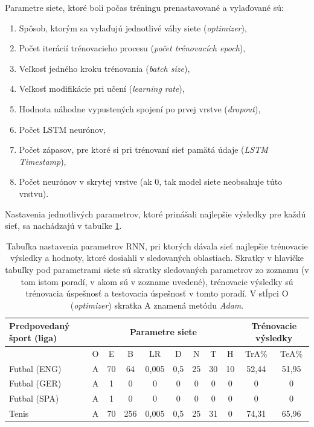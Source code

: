 Parametre siete, ktoré boli počas tréningu prenastavované a vylaďované sú:
\begin{enumerate}
  \item Spôsob, ktorým sa vylaďujú jednotlivé váhy siete (\textit{optimizer}),
  \item Počet iterácií trénovacieho procesu (\textit{počet trénovacích epoch}),
  \item Veľkosť jedného kroku trénovania (\textit{batch size}),
  \item Veľkosť modifikácie pri učení (\textit{learning rate}),
  \item Hodnota náhodne vypustených spojení po prvej vrstve (\textit{dropout}),
  \item Počet LSTM neurónov,
  \item Počet zápasov, pre ktoré si pri trénovaní sieť pamätá údaje (\textit{LSTM Timestamp}),
  \item Počet neurónov v skrytej vrstve (ak 0, tak model siete neobsahuje túto vrstvu).
\end{enumerate}

Nastavenia jednotlivých parametrov, ktoré prinášali najlepšie výsledky pre každú sieť, sa nachádzajú v tabuľke \ref{rnn_train_res}.

\begin{table}[h!]
\begin{center}
\begin{tabular}{ p{7em}|c|c|c|c|c|c|c|c|c|c| } 
 Predpovedaný šport (liga) & \multicolumn{8}{|c|}{Parametre siete} & \multicolumn{2}{|p{5em}|}{Trénovacie výsledky}  \\ 
 \hline
  & O & E & B & LR & D & N & T & H & TrA\% & TeA\% \\
 \hline \hline
 Futbal (ENG) & A & 70 & 64 & 0,005 & 0,5 & 25 & 30 & 10 & 52,44 & 51,95  \\ 
 Futbal (GER) & A & 1 & 0 & 0 & 0 & 0 & 0 & 0 & 0 & 0  \\ 
 Futbal (SPA) & A & 1 & 0 & 0 & 0 & 0 & 0 & 0 & 0 & 0  \\ 
 Tenis & A & 70 & 256 & 0,005 & 0,5 & 25 & 31 & 0 & 74,31 & 65,96  \\ 
 \hline
\end{tabular}
\caption{Tabuľka nastavenia parametrov RNN, pri ktorých dávala sieť najlepšie trénovacie výsledky a hodnoty, ktoré dosiahli v sledovaných oblastiach. Skratky v hlavičke tabuľky pod parametrami siete sú skratky sledovaných parametrov zo zoznamu (v tom istom poradí, v akom sú v zozname uvedené), trénovacie výsledky sú trénovacia úspešnosť a testovacia úspešnosť v tomto poradí. V stĺpci O (\textit{optimizer}) skratka A znamená metódu \textit{Adam}.}
\label{rnn_train_res}
\end{center}
\end{table}